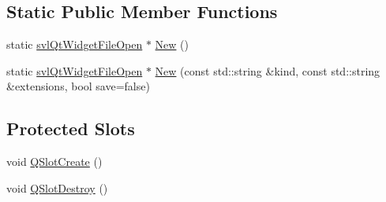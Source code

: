 \subsection*{Static Public Member Functions}
\begin{DoxyCompactItemize}
\item 
static \hyperlink{classsvl_qt_widget_file_open}{svl\-Qt\-Widget\-File\-Open} $\ast$ \hyperlink{classsvl_qt_widget_file_open_a1399a6ddb506de4ec7e41ac39035bb0c}{New} ()
\item 
static \hyperlink{classsvl_qt_widget_file_open}{svl\-Qt\-Widget\-File\-Open} $\ast$ \hyperlink{classsvl_qt_widget_file_open_a84d4331919b81b724b54e2e57934cf3e}{New} (const std\-::string \&kind, const std\-::string \&extensions, bool save=false)
\end{DoxyCompactItemize}
\subsection*{Protected Slots}
\begin{DoxyCompactItemize}
\item 
void \hyperlink{classsvl_qt_widget_file_open_a69e3119d02fd8ac8ee0041e770ecf4c2}{Q\-Slot\-Create} ()
\item 
void \hyperlink{classsvl_qt_widget_file_open_a5044581afdd2fa753462024df32208d9}{Q\-Slot\-Destroy} ()
\end{DoxyCompactItemize}


